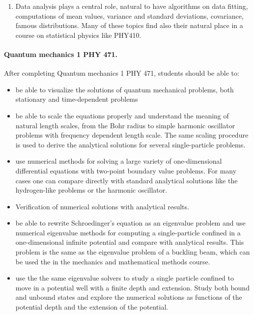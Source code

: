 \documentclass[%
oneside,                 %
final,                   %
10pt]{article}
\begin{document}
\begin{enumerate}
  \item Data analysis plays a central role, natural to have algorithms on data fitting, computations  of mean values, variance and standard deviations, covariance, famous distributions. Many of these topics find also their natural place in a course on statistical physics like PHY410.
\end{enumerate}

\noindent
\paragraph{Quantum mechanics 1  PHY 471.}
After completing Quantum mechanics 1  PHY 471, students should be able to:
\begin{itemize}
  \item be able to visualize the solutions of quantum mechanical problems, both stationary and time-dependent problems

  \item be able to scale the equations properly and understand the meaning of natural length scales, from the Bohr radius to simple harmonic oscillator problems with frequency dependent length scale. The same scaling procedure is  used to derive the analytical solutions for several single-particle problems. 

  \item use numerical methods for solving a large variety of one-dimensional differential equations with two-point boundary value problems. For many cases one can compare directly with standard analytical  solutions like the hydrogen-like problems or the harmonic oscillator.

  \item Verification of numerical solutions with analytical results.

  \item be able to rewrite Schroedinger's equation as an eigenvalue problem and use numerical eigenvalue methods for computing a single-particle confined in a one-dimensional infinite potential and compare with analytical results. This problem is the same as the eigenvalue problem of a buckling beam, which can be used the in the mechanics and mathematical methods course. 

  \item use the the same eigenvalue solvers to study a single particle confined to move in a potential well with a finite depth and extension. Study both bound and unbound states and explore the numerical solutions as functions of the potential depth and the extension of the potential. 


\end{itemize}
\end{document}
